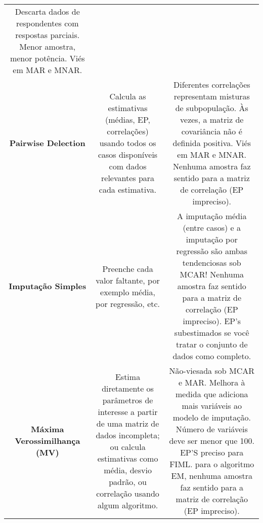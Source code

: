 \documentclass[
  openany]{book}
\begin{document}
\begin{longtable}[]{@{}ccc@{}}
\begin{minipage}[t]{0.30\columnwidth}
Descarta dados de respondentes com respostas parciais. Menor amostra, menor potência. Viés em MAR e MNAR.\strut
\end{minipage}\tabularnewline
\begin{minipage}[t]{0.30\columnwidth}\centering
\textbf{Pairwise Delection}\strut
\end{minipage} & \begin{minipage}[t]{0.30\columnwidth}\centering
Calcula as estimativas (médias, EP, correlações) usando todos os casos disponíveis com dados relevantes para cada estimativa.\strut
\end{minipage} & \begin{minipage}[t]{0.30\columnwidth}\centering
Diferentes correlações representam misturas de subpopulação. Às vezes, a matriz de covariância não é definida positiva. Viés em MAR e MNAR. Nenhuma amostra faz sentido para a matriz de correlação (EP impreciso).\strut
\end{minipage}\tabularnewline
\begin{minipage}[t]{0.30\columnwidth}\centering
\textbf{Imputação Simples}\strut
\end{minipage} & \begin{minipage}[t]{0.30\columnwidth}\centering
Preenche cada valor faltante, por exemplo média, por regressão, etc.\strut
\end{minipage} & \begin{minipage}[t]{0.30\columnwidth}\centering
A imputação média (entre casos) e a imputação por regressão são ambas tendenciosas sob MCAR! Nenhuma amostra faz sentido para a matriz de correlação (EP impreciso). EP's subestimados se você tratar o conjunto de dados como completo.\strut
\end{minipage}\tabularnewline
\begin{minipage}[t]{0.30\columnwidth}\centering
\textbf{Máxima Verossimilhança (MV)}\strut
\end{minipage} & \begin{minipage}[t]{0.30\columnwidth}\centering
Estima diretamente os parâmetros de interesse a partir de uma matriz de dados incompleta; ou calcula estimativas como média, desvio padrão, ou correlação usando algum algoritmo.\strut
\end{minipage} & \begin{minipage}[t]{0.30\columnwidth}\centering
Não-viesada sob MCAR e MAR. Melhora à medida que adiciona mais variáveis ao modelo de imputação. Número de variáveis deve ser menor que 100. EP'S preciso para FIML. para o algoritmo EM, nenhuma amostra faz sentido para a matriz de correlação (EP impreciso).\strut

\end{minipage}
\end{longtable}
\end{document}
